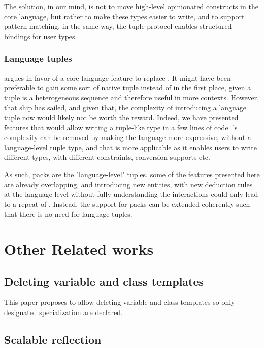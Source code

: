 \documentclass{wg21}
\begin{document}
The solution, in our mind, is not to move high-level opinionated constructs in the core language, but rather to make these types easier to write,
and to support pattern matching, in the same way, the tuple protocol enables structured bindings for user types.

\subsubsection{Language tuples}

 argues in favor of a core language feature to replace .
It might have been preferable to gain some sort of native tuple instead of  in the first place, given a tuple is a heterogeneous sequence and therefore useful in more contexts.
However, that ship has sailed, and given that, the complexity of introducing a language tuple now would likely not be worth the reward.
Indeed, we have presented features that would allow writing a tuple-like type in a few lines of code. 's complexity can be removed by making the language more expressive, without a language-level tuple type, and that is more applicable as it enables users to write different  types, with different constraints,
conversion supports etc.

As such, packs are the "language-level" tuples. some of the features presented here are already overlapping, and introducing new entities, with new deduction rules at the language-level without fully understanding the interactions could only
lead to a repeat of . Instead, the support for packs can be extended coherently such that there is no need for language tuples.

\section{Other Related works}

\subsection{ Deleting variable and class templates}

This paper proposes to allow deleting variable and class templates so only designated specialization are declared.

\subsection{ Scalable reflection}
\end{document}
